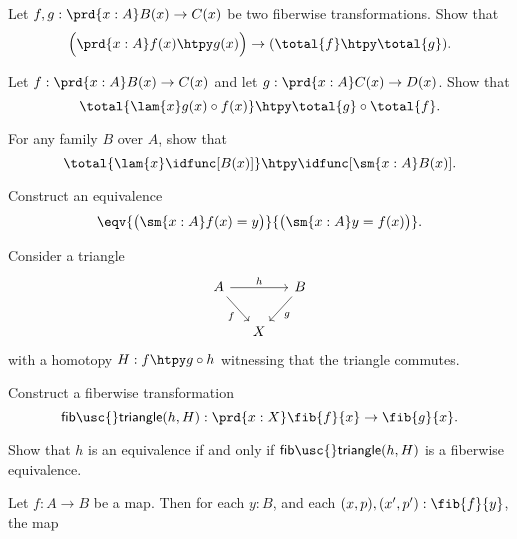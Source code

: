 \begin{exercises}
\item \label{ex:htpy_total} 
\begin{subexenum}
\item Let $f,g:\prd{x:A}B(x)\to C(x)$ be two fiberwise transformations. Show that
\begin{equation*}
\Big(\prd{x:A}f(x)\htpy g(x)\Big)\to (\total{f}\htpy \total{g}). 
\end{equation*}
\item Let $f:\prd{x:A}B(x)\to C(x)$ and let $g:\prd{x:A}C(x)\to D(x)$. Show that
\begin{equation*}
\total{\lam{x}g(x)\circ f(x)}\htpy \total{g}\circ\total{f}.
\end{equation*}
\item For any family $B$ over $A$, show that
\begin{equation*}
\total{\lam{x}\idfunc[B(x)]}\htpy\idfunc[\sm{x:A}B(x)].
\end{equation*}
\end{subexenum}
\item Construct an equivalence 
\begin{equation*}
\eqv{\big(\sm{x:A}f(x)=y\big)}{\big(\sm{x:A}y=f(x)\big)}.
\end{equation*}
\item \label{ex:fiber_trans}Consider a triangle
\begin{equation*}
\begin{tikzcd}[column sep=small]
A \arrow[rr,"h"] \arrow[dr,swap,"f"] & & B \arrow[dl,"g"] \\
& X
\end{tikzcd}
\end{equation*}
with a homotopy $H:f\htpy g\circ h$ witnessing that the triangle commutes. 
\begin{subexenum}
\item Construct a fiberwise transformation
\begin{equation*}
\mathsf{fib\usc{}triangle}(h,H):\prd{x:X}\fib{f}{x}\to\fib{g}{x}.
\end{equation*}
\item Show that $h$ is an equivalence if and only if $\mathsf{fib\usc{}triangle}(h,H)$ is a fiberwise equivalence.
\end{subexenum}
\item Let $f:A\to B$ be a map. Then for each $y:B$, and each $(x,p),(x',p'):\fib{f}{y}$, the map
\begin{equation*}

\end{equation*}
\end{exercises}
